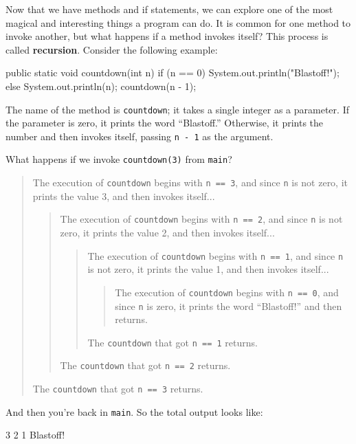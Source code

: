 \documentclass[12pt]{book}
\theoremstyle{exercise}
\newcommand{\java}[1]{\lstinline{#1}} %
\begin{document}

Now that we have methods and if statements, we can explore one of the most magical and interesting things a program can do.
It is common for one method to invoke another, but what happens if a method invokes itself?
This process is called {\bf recursion}.
Consider the following example:

\begin{code}
    public static void countdown(int n) {
        if (n == 0) {
            System.out.println("Blastoff!");
        } else {
            System.out.println(n);
            countdown(n - 1);
        }
    }
\end{code}

The name of the method is \java{countdown}; it takes a single integer as a parameter.
If the parameter is zero, it prints the word ``Blastoff.''
Otherwise, it prints the number and then invokes itself, passing \java{n - 1} as the argument.

What happens if we invoke \java{countdown(3)} from \java{main}?

\vspace{-1ex}
\begin{quote}
The execution of \java{countdown} begins with \java{n == 3}, and since \java{n} is not zero, it prints the value 3, and then invokes itself...
\begin{quote}
The execution of \java{countdown} begins with \java{n == 2}, and since \java{n} is not zero, it prints the value 2, and then invokes itself...
\begin{quote}
The execution of \java{countdown} begins with \java{n == 1}, and since \java{n} is not zero, it prints the value 1, and then invokes itself...
\begin{quote}
The execution of \java{countdown} begins with \java{n == 0}, and since \java{n} is zero, it prints the word ``Blastoff!'' and then returns.
\end{quote}
The \java{countdown} that got \java{n == 1} returns.
\end{quote}
The \java{countdown} that got \java{n == 2} returns.
\end{quote}
The \java{countdown} that got \java{n == 3} returns.
\end{quote}
\vspace{-1ex}

And then you're back in \java{main}.
So the total output looks like:

\begin{stdout}
3
2
1
Blastoff!
\end{stdout}
\end{document}
